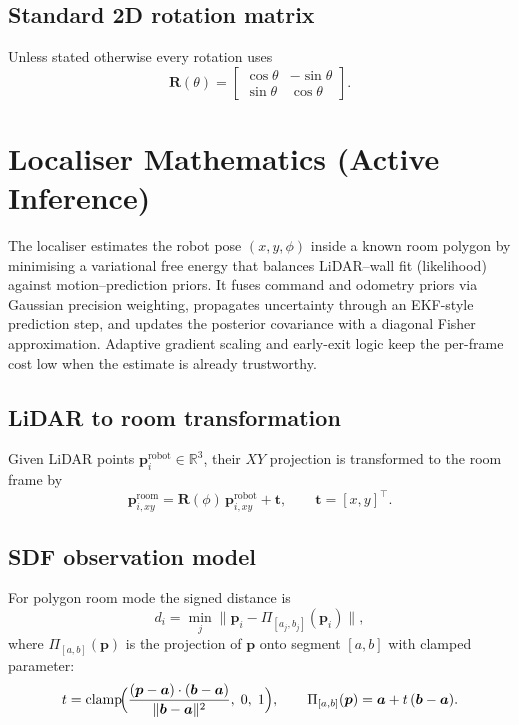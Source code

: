 \documentclass[a4paper, 11pt]{article}
\newcommand{\R}{\mathbb{R}}
\newcommand{\vect}[1]{\bm{#1}}
\newcommand{\mat}[1]{\bm{#1}}
\begin{document}
\subsection{Standard 2D rotation matrix}

Unless stated otherwise every rotation uses
\begin{equation}\label{eq:R2d}
  \mat{R}(\theta)
  = \begin{bmatrix}
      \cos\theta & -\sin\theta \\
      \sin\theta &  \cos\theta
    \end{bmatrix}.
\end{equation}

\section{Localiser Mathematics (Active Inference)}\label{sec:localiser}

The localiser estimates the robot pose $(x, y, \phi)$ inside a
known room polygon by minimising a variational free energy that
balances LiDAR--wall fit (likelihood) against motion--prediction
priors.  It fuses command and odometry priors via Gaussian precision
weighting, propagates uncertainty through an EKF-style prediction
step, and updates the posterior covariance with a diagonal Fisher
approximation.  Adaptive gradient scaling and early-exit logic keep
the per-frame cost low when the estimate is already trustworthy.

\subsection{LiDAR to room transformation}

Given LiDAR points $\vect{p}_i^{\text{robot}} \in \R^3$,
their $XY$ projection is transformed to the room frame by
\begin{equation}
  \vect{p}_{i,xy}^{\text{room}}
  = \mat{R}(\phi)\,\vect{p}_{i,xy}^{\text{robot}} + \vect{t},
  \qquad
  \vect{t} = [x, y]^\top.
\end{equation}

\subsection{SDF observation model}

For polygon room mode the signed distance is
\begin{equation}\label{eq:sdf}
  d_i = \min_j \bigl\|\vect{p}_i - \Pi_{[a_j, b_j]}(\vect{p}_i)\bigr\|,
\end{equation}
where $\Pi_{[a,b]}(\vect{p})$ is the projection of $\vect{p}$ onto segment
$[a, b]$ with clamped parameter:
\begin{equation}\label{eq:seg-proj}
  t = \operatorname{clamp}\!\Bigl(
    \frac{(\vect{p} - \vect{a}) \cdot (\vect{b} - \vect{a})}
         {\|\vect{b} - \vect{a}\|^2},\; 0,\; 1
  \Bigr),
  \qquad
  \Pi_{[a,b]}(\vect{p}) = \vect{a} + t\,(\vect{b}-\vect{a}).
\end{equation}
\end{document}
